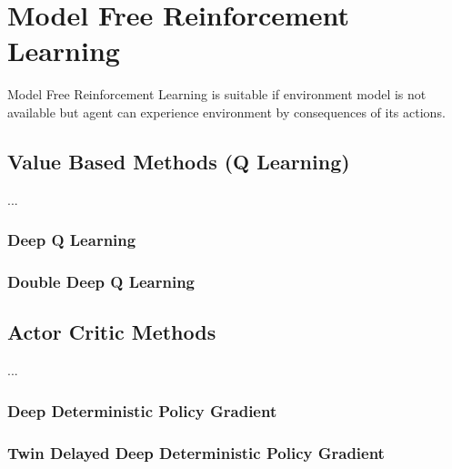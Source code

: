 \section{Model Free Reinforcement Learning}
\label{sec:mf_rl}

Model Free Reinforcement Learning is suitable if environment model is not available but agent can experience environment by consequences of its actions.

\subsection{Value Based Methods (Q Learning)}
 ...
\subsubsection{Deep Q Learning}

\subsubsection{Double Deep Q Learning}

\subsection{Actor Critic Methods}

...

\subsubsection{Deep Deterministic Policy Gradient}

\subsubsection{Twin Delayed Deep Deterministic Policy Gradient}